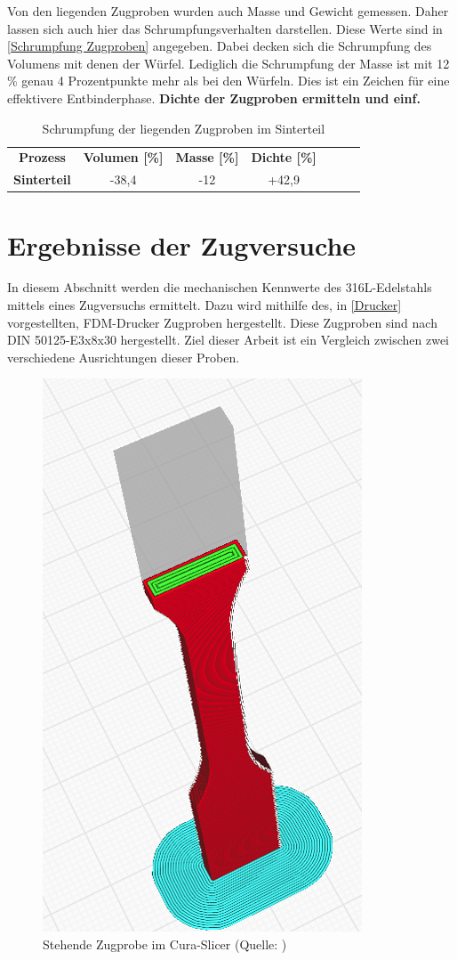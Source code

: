 Von den liegenden Zugproben wurden auch Masse und Gewicht gemessen. Daher lassen sich auch hier das Schrumpfungsverhalten darstellen. Diese Werte sind in \autoref{Schrumpfung Zugproben} angegeben. Dabei decken sich die Schrumpfung des Volumens mit denen der Würfel. Lediglich die Schrumpfung der Masse ist mit 12 \% genau 4 Prozentpunkte mehr als bei den Würfeln. Dies ist ein Zeichen für eine effektivere Entbinderphase. \textbf{Dichte der Zugproben ermitteln und einf.}


\begin{table}[h]
    \centering
    \caption{Schrumpfung der liegenden Zugproben im Sinterteil}
      \begin{tabular}{ccccccc}
      \toprule
      \textbf{Prozess} & \multicolumn{1}{c}{\textbf{Volumen [\%]}} & \multicolumn{1}{c}{\textbf{Masse [\%]}} & \multicolumn{1}{c}{\textbf{Dichte [\%]}} \\
        \textbf{Sinterteil} & -38,4 & -12 & +42,9 \\
      \bottomrule
      \end{tabular}%
    \label{Schrumpfung Zugproben}%
  \end{table}%
  \FloatBarrier

\section{Ergebnisse der Zugversuche}

In diesem Abschnitt werden die mechanischen Kennwerte des 316L-Edelstahls mittels eines Zugversuchs ermittelt. Dazu wird mithilfe des, in \autoref{Drucker} vorgestellten, FDM-Drucker Zugproben hergestellt. Diese Zugproben sind nach DIN 50125-E3x8x30 hergestellt.
Ziel dieser Arbeit ist ein Vergleich zwischen zwei verschiedene Ausrichtungen dieser Proben.
\begin{figure}[h] 
  \centering
  \includegraphics[width=0.4\linewidth]{bilder/Screenshot 2023-11-01 171423.png}
        \caption[Stehende Zugprobe im Cura-Slicer] {Stehende Zugprobe im Cura-Slicer (Quelle: \autocite{Prusa})}
  \label{stehende Zugprobe}
\end{figure}
\FloatBarrier


